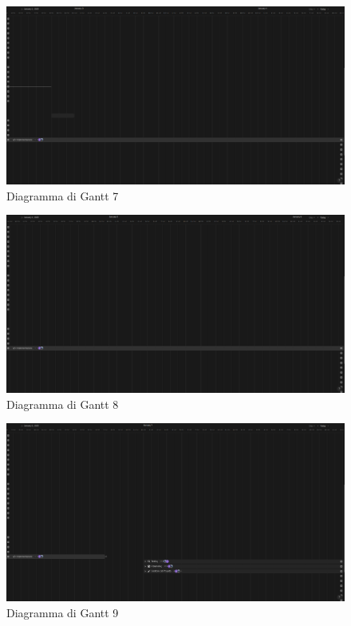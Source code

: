 \documentclass[12pt]{article}
\begin{document}
\begin{figure}[H]
    \includegraphics[width=\textwidth,keepaspectratio]{Immagini/Gantt/Iterazione 1/Gantt7.png}
        \caption{Diagramma di Gantt 7} 
        \label{fig:Gantt7}
\end{figure}

\begin{figure}[H]
    \includegraphics[width=\textwidth,keepaspectratio]{Immagini/Gantt/Iterazione 1/Gantt8.png}
        \caption{Diagramma di Gantt 8} 
        \label{fig:Gantt8}
\end{figure}

\begin{figure}[H]
    \includegraphics[width=\textwidth,keepaspectratio]{Immagini/Gantt/Iterazione 1/Gantt9.png}
        \caption{Diagramma di Gantt 9} 
        \label{fig:Gantt9}
\end{figure}
\end{document}
